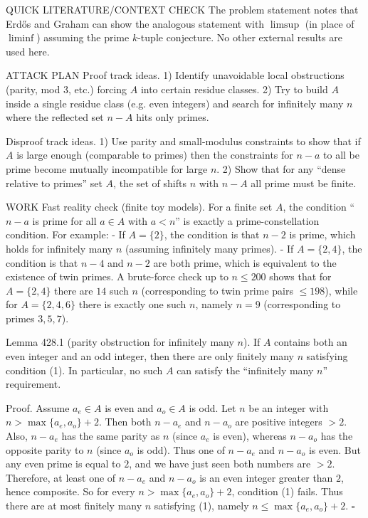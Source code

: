 QUICK LITERATURE/CONTEXT CHECK
The problem statement notes that Erd\H{o}s and Graham can show the analogous statement with $\limsup$ (in place of $\liminf$) assuming the prime $k$-tuple conjecture. No other external results are used here.

ATTACK PLAN
Proof track ideas.
1) Identify unavoidable local obstructions (parity, mod $3$, etc.) forcing $A$ into certain residue classes.
2) Try to build $A$ inside a single residue class (e.g. even integers) and search for infinitely many $n$ where the reflected set $n-A$ hits only primes.

Disproof track ideas.
1) Use parity and small-modulus constraints to show that if $A$ is large enough (comparable to primes) then the constraints for $n-a$ to all be prime become mutually incompatible for large $n$.
2) Show that for any “dense relative to primes” set $A$, the set of shifts $n$ with $n-A$ all prime must be finite.

WORK
Fast reality check (finite toy models).
For a finite set $A$, the condition “$n-a$ is prime for all $a\in A$ with $a<n$” is exactly a prime-constellation condition.
For example:
- If $A=\{2\}$, the condition is that $n-2$ is prime, which holds for infinitely many $n$ (assuming infinitely many primes).
- If $A=\{2,4\}$, the condition is that $n-4$ and $n-2$ are both prime, which is equivalent to the existence of twin primes.
A brute-force check up to $n\le 200$ shows that for $A=\{2,4\}$ there are $14$ such $n$ (corresponding to twin prime pairs $\le 198$), while for $A=\{2,4,6\}$ there is exactly one such $n$, namely $n=9$ (corresponding to primes $3,5,7$).

Lemma 428.1 (parity obstruction for infinitely many $n$).
If $A$ contains both an even integer and an odd integer, then there are only finitely many $n$ satisfying condition (1). In particular, no such $A$ can satisfy the “infinitely many $n$” requirement.

Proof.
Assume $a_e\in A$ is even and $a_o\in A$ is odd.
Let $n$ be an integer with $n>\max\{a_e,a_o\}+2$.
Then both $n-a_e$ and $n-a_o$ are positive integers $>2$.
Also, $n-a_e$ has the same parity as $n$ (since $a_e$ is even), whereas $n-a_o$ has the opposite parity to $n$ (since $a_o$ is odd). Thus one of $n-a_e$ and $n-a_o$ is even.
But any even prime is equal to $2$, and we have just seen both numbers are $>2$. Therefore, at least one of $n-a_e$ and $n-a_o$ is an even integer greater than $2$, hence composite.
So for every $n>\max\{a_e,a_o\}+2$, condition (1) fails.
Thus there are at most finitely many $n$ satisfying (1), namely $n\le \max\{a_e,a_o\}+2$.
\hfill $\square$

